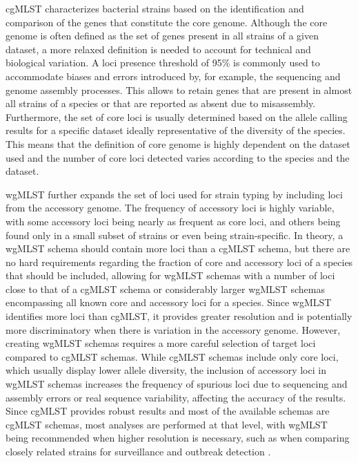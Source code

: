 \ac{cgMLST} characterizes bacterial strains based on the identification and comparison of the genes that constitute the core genome. Although the core genome is often defined as the set of genes present in all strains of a given dataset, a more relaxed definition is needed to account for technical and biological variation. A loci presence threshold of 95\% is commonly used to accommodate biases and errors introduced by, for example, the sequencing and genome assembly processes. This allows to retain genes that are present in almost all strains of a species or that are reported as absent due to misassembly. Furthermore, the set of core loci is usually determined based on the allele calling results for a specific dataset ideally representative of the diversity of the species. This means that the definition of core genome is highly dependent on the dataset used and the number of core loci detected varies according to the species and the dataset.

\ac{wgMLST} further expands the set of loci used for strain typing by including loci from the accessory genome. The frequency of accessory loci is highly variable, with some accessory loci being nearly as frequent as core loci, and others being found only in a small subset of strains or even being strain-specific. In theory, a \ac{wgMLST} schema should contain more loci than a \ac{cgMLST} schema, but there are no hard requirements regarding the fraction of core and accessory loci of a species that should be included, allowing for \ac{wgMLST} schemas with a number of loci close to that of a \ac{cgMLST} schema or considerably larger \ac{wgMLST} schemas encompassing all known core and accessory loci for a species. Since \ac{wgMLST} identifies more loci than \ac{cgMLST}, it provides greater resolution and is potentially more discriminatory when there is variation in the accessory genome. However, creating \ac{wgMLST} schemas requires a more careful selection of target loci compared to \ac{cgMLST} schemas. While \ac{cgMLST} schemas include only core loci, which usually display lower allele diversity, the inclusion of accessory loci in \ac{wgMLST} schemas increases the frequency of spurious loci due to sequencing and assembly errors or real sequence variability, affecting the accuracy of the results. Since \ac{cgMLST} provides robust results and most of the available schemas are \ac{cgMLST} schemas, most analyses are performed at that level, with \ac{wgMLST} being recommended when higher resolution is necessary, such as when comparing closely related strains for surveillance and outbreak detection \cite{mixao_multi-country_2025, joseph_evaluation_2023, leeper_evaluation_2023, leeper_validation_2025}.

